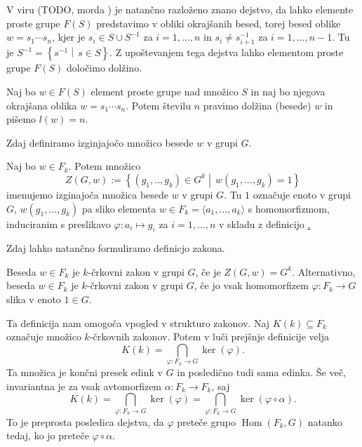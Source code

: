 \documentclass[mat1, tisk]{fmfdelo}
\begin{document}
\noindent
V viru (TODO, morda \cite[str.~4]{Lyndon_Schupp_2015}) je natančno razloženo znano dejstvo, da lahko elemente proste grupe $F(S)$ predstavimo v obliki okrajšanih besed,
torej besed oblike $w = s_1 \cdots s_n$, kjer je $s_i \in S \cup S^{-1}$ za $i = 1, \ldots, n$ in $s_i \neq s_{i+1}^{-1}$ za $i = 1, \ldots, n-1$. Tu je $S^{-1} = \left\{ s^{-1}  \middle|\, s \in  S \right\}$.
Z upoštevanjem tega dejstva lahko elementom proste grupe $F(S)$ določimo dolžino.

\begin{definicija}
\label{def_dolzina_besede}
Naj bo $w \in  F(S)$ element proste grupe nad množico $S$ in naj bo njegova okrajšana oblika $w = s_1 \cdots s_n$. Potem številu $n$ pravimo dolžina (besede) $w$ in pišemo $l(w) = n$.
\end{definicija}

\noindent
Zdaj definiramo izginjajočo množico besede $w$ v grupi $G$.

\begin{definicija}
\label{def_izginjajoca_mnozica}
Naj bo $w \in  F_k$. Potem množico \begin{equation*}
Z(G, w) := \left\{ (g_1, .., g_{k}) \in  G^{k}  \middle|\, w(g_1, \ldots, g_{k}) = 1 \right\} 
\end{equation*}  
imenujemo izginajoča množica besede $w$ v grupi $G$. Tu $1$ označuje enoto v grupi $G$, $w(g_1, \ldots, g_{k})$ pa sliko elementa $w \in F_k = \langle a_{1}, \ldots , a_k \rangle$ s homomorfizmom,
induciranim s preslikavo $\varphi: a_{i} \mapsto g_{i}$ za $i = 1,\ldots, n$ v skladu z definicijo \href{def_prosta_grupa}.  
\end{definicija}

\indent
Zdaj lahko natančno formuliramo definicjo zakona.

\begin{definicija}
\label{def_zakon_formalna}
Beseda $w \in F_k$ je $k$-črkovni zakon v grupi $G$, če je $Z(G, w) = G^{k}$. Alternativno, beseda $w \in F_k$ je $k$-črkovni zakon v grupi $G$, če jo vsak homomorfizem $\varphi: F_k \to G$ slika v enoto $1 \in G$.   
\end{definicija}

Ta definicija nam omogoča vpogled v strukturo zakonov. Naj $K(k) \subseteq F_k$ označuje množico $k$-črkovnih zakonov. Potem v luči prejšnje definicije velja
\begin{equation*}
K(k)  = \bigcap_{\varphi: F_k \to G} \operatorname{ker}(\varphi).   
\end{equation*}  
Ta množica je končni presek edink v $G$ in posledično tudi sama edinka. Še več, invariantna je za vsak avtomorfizem $\alpha: F_k \to  F_k$, saj
\begin{equation*}
    K(k)  = \bigcap_{\varphi: F_k \to G} \operatorname{ker}(\varphi) = \bigcap_{\varphi: F_k \to G} \operatorname{ker}(\varphi \circ \alpha). 
\end{equation*}  
To je preprosta posledica dejstva, da $\varphi$ preteče grupo $\operatorname{Hom}(F_k, G)$ natanko tedaj, ko jo preteče $\varphi \circ \alpha$.     
\end{document}
